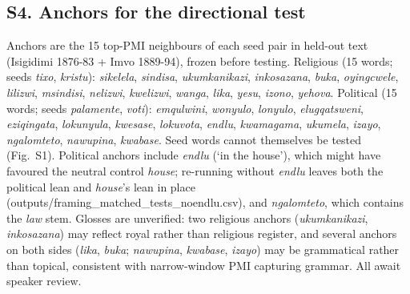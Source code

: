 \subsection*{S4. Anchors for the directional test}
Anchors are the 15 top-PMI neighbours of each seed pair in held-out text (Isigidimi 1876-83 + Imvo 1889-94), frozen before testing. Religious (15 words; seeds \emph{tixo}, \emph{kristu}): \emph{sikelela}, \emph{sindisa}, \emph{ukumkanikazi}, \emph{inkosazana}, \emph{buka}, \emph{oyingcwele}, \emph{lilizwi}, \emph{msindisi}, \emph{nelizwi}, \emph{kwelizwi}, \emph{wanga}, \emph{lika}, \emph{yesu}, \emph{izono}, \emph{yehova}. Political (15 words; seeds \emph{palamente}, \emph{voti}): \emph{emqulwini}, \emph{wonyulo}, \emph{lonyulo}, \emph{elugqatsweni}, \emph{eziqingata}, \emph{lokunyula}, \emph{kwesase}, \emph{lokuvota}, \emph{endlu}, \emph{kwamagama}, \emph{ukumela}, \emph{izayo}, \emph{ngalomteto}, \emph{nawupina}, \emph{kwabase}. Seed words cannot themselves be tested (Fig.~S1). Political anchors include \emph{endlu} (`in the house'), which might have favoured the neutral control \emph{house}; re-running without \emph{endlu} leaves both the political lean and \emph{house}'s lean in place (outputs/framing\_matched\_tests\_noendlu.csv), and \emph{ngalomteto}, which contains the \emph{law} stem. Glosses are unverified: two religious anchors (\emph{ukumkanikazi}, \emph{inkosazana}) may reflect royal rather than religious register, and several anchors on both sides (\emph{lika}, \emph{buka}; \emph{nawupina}, \emph{kwabase}, \emph{izayo}) may be grammatical rather than topical, consistent with narrow-window PMI capturing grammar. All await speaker review.
\normalsize

